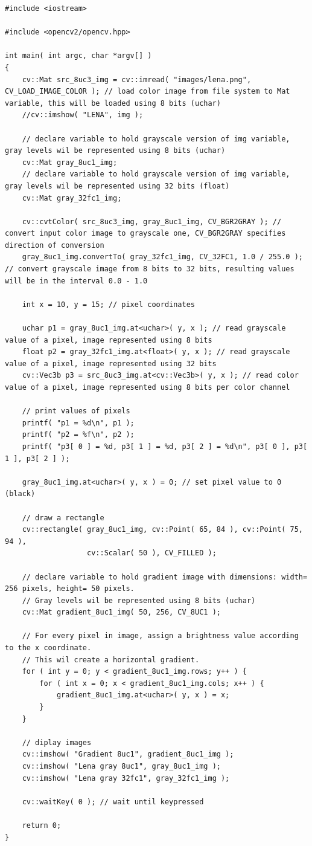 \documentclass[10pt]{article}
\begin{document}
\begin{lstlisting}[style=CStyle,caption={Full exercise code.},label={lst:full}]
#include <iostream>

#include <opencv2/opencv.hpp>

int main( int argc, char *argv[] )
{
    cv::Mat src_8uc3_img = cv::imread( "images/lena.png", CV_LOAD_IMAGE_COLOR ); // load color image from file system to Mat variable, this will be loaded using 8 bits (uchar)
    //cv::imshow( "LENA", img );

    // declare variable to hold grayscale version of img variable, gray levels wil be represented using 8 bits (uchar)
    cv::Mat gray_8uc1_img;
    // declare variable to hold grayscale version of img variable, gray levels wil be represented using 32 bits (float)
    cv::Mat gray_32fc1_img;

    cv::cvtColor( src_8uc3_img, gray_8uc1_img, CV_BGR2GRAY ); // convert input color image to grayscale one, CV_BGR2GRAY specifies direction of conversion
    gray_8uc1_img.convertTo( gray_32fc1_img, CV_32FC1, 1.0 / 255.0 ); // convert grayscale image from 8 bits to 32 bits, resulting values will be in the interval 0.0 - 1.0

    int x = 10, y = 15; // pixel coordinates

    uchar p1 = gray_8uc1_img.at<uchar>( y, x ); // read grayscale value of a pixel, image represented using 8 bits
    float p2 = gray_32fc1_img.at<float>( y, x ); // read grayscale value of a pixel, image represented using 32 bits
    cv::Vec3b p3 = src_8uc3_img.at<cv::Vec3b>( y, x ); // read color value of a pixel, image represented using 8 bits per color channel

    // print values of pixels
    printf( "p1 = %d\n", p1 );
    printf( "p2 = %f\n", p2 );
    printf( "p3[ 0 ] = %d, p3[ 1 ] = %d, p3[ 2 ] = %d\n", p3[ 0 ], p3[ 1 ], p3[ 2 ] );

    gray_8uc1_img.at<uchar>( y, x ) = 0; // set pixel value to 0 (black)

    // draw a rectangle
    cv::rectangle( gray_8uc1_img, cv::Point( 65, 84 ), cv::Point( 75, 94 ),
                   cv::Scalar( 50 ), CV_FILLED );

    // declare variable to hold gradient image with dimensions: width= 256 pixels, height= 50 pixels.
    // Gray levels wil be represented using 8 bits (uchar)
    cv::Mat gradient_8uc1_img( 50, 256, CV_8UC1 );

    // For every pixel in image, assign a brightness value according to the x coordinate.
    // This wil create a horizontal gradient.
    for ( int y = 0; y < gradient_8uc1_img.rows; y++ ) {
        for ( int x = 0; x < gradient_8uc1_img.cols; x++ ) {
            gradient_8uc1_img.at<uchar>( y, x ) = x;
        }
    }

    // diplay images
    cv::imshow( "Gradient 8uc1", gradient_8uc1_img );
    cv::imshow( "Lena gray 8uc1", gray_8uc1_img );
    cv::imshow( "Lena gray 32fc1", gray_32fc1_img );

    cv::waitKey( 0 ); // wait until keypressed

    return 0;
}
\end{lstlisting}
\end{document}
